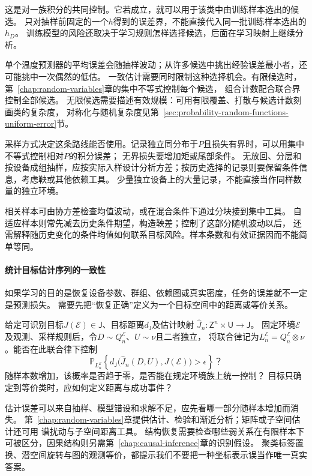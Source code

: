 这是对一族积分的共同控制。它若成立，就可以用于该类中由训练样本选出的候选。
只对抽样前固定的一个$h$得到的误差界，不能直接代入同一批训练样本选出的$h_D$。
训练模型的风险还取决于学习规则怎样选择候选，后面在学习映射上继续分析。

单个温度预测器的平均误差会随抽样波动；从许多候选中挑出经验误差最小者，还可能挑中一次偶然的低估。
一致估计需要同时限制这种选择机会。有限候选时，第~\ref{chap:random-variables}章的集中不等式控制每个候选，
组合计数配合联合界控制全部候选。
无限候选需要描述有效规模：可用有限覆盖、打散与候选计数刻画类的复杂度，
对称化与随机复杂度见第~\ref{sec:probability-random-functions-uniform-error}节。

采样方式决定这条路线能否使用。记录独立同分布于$P$且损失有界时，可以用集中不等式控制相对$P$的积分误差；
无界损失要增加矩或尾部条件。
无放回、分层和按设备成组抽样，应按实际入样设计分析方差；按历史选择的记录则要保留条件信息，考虑鞅或其他依赖工具。
少量独立设备上的大量记录，不能直接当作同样数量的独立环境。

相关样本可由协方差检查均值波动，或在混合条件下通过分块接到集中工具。
自适应样本则常先减去历史条件期望，构造鞅差；控制了这部分随机波动以后，
还需解释随历史变化的条件均值如何联系目标风险。样本条数和有效证据因而不能简单等同。

\paragraph{统计目标估计序列的一致性}
\label{sec:future-analysis-statistical-recovery}

如果学习的目的是恢复设备参数、群组、依赖图或真实密度，任务的误差就不一定是预测损失。
需要先把“恢复正确”定义为一个目标空间中的距离或等价关系。

\begin{mathproblem}[估计映射的恢复误差与统计一致性]
  \label{question:future-statistical-recovery}
  给定可识别目标$J(\mathcal E)\in\mathsf J$、目标距离$d_{\mathsf J}$及估计映射
  $\widehat J_n:\mathsf Z^n\times\mathsf U\to\mathsf J$。
  固定环境$\mathcal E$及观测、采样规则后，令$D\sim Q_n^{\mathcal E}$、$U\sim\nu$且二者独立，
  将联合律记为$L_n^{\mathcal E}=Q_n^{\mathcal E}\otimes\nu$。能否在此联合律下控制
  \[
    \mathbb P_{L_n^{\mathcal E}}\!\left\{
      d_{\mathsf J}\bigl(\widehat J_n(D,U),J(\mathcal E)\bigr)>\epsilon
    \right\}\text{？}
  \]
  随样本数增加，该概率是否趋于零，是否能在规定环境族上统一控制？
  目标只确定到等价类时，应如何定义距离与成功事件？
\end{mathproblem}

估计误差可以来自抽样、模型错设和求解不足，应先看哪一部分随样本增加而消失。
第~\ref{chap:random-variables}章提供估计、检验和渐近分析；矩阵或子空间估计还可用
谱扰动与子空间距离工具。
结构恢复需要检查哪些弱关系在有限样本下可被区分，因果结构则另需第~\ref{chap:causal-inference}章的识别假设。
聚类标签置换、潜空间旋转与图的观测等价，都提示我们不要把一种坐标表示误当作唯一真实答案。

